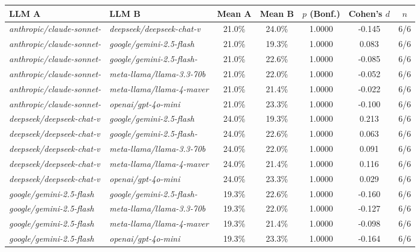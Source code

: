\begin{table}
\centering
{\scriptsize
\begin{tabular}{l|l|c|c|c|c|c}
\textbf{LLM A} & \textbf{LLM B} & \textbf{Mean A} & \textbf{Mean B} & \textbf{$p$ (Bonf.)} & \textbf{Cohen's $d$} & \textbf{$n$} \\
\hline\hline
\textit{anthropic/claude-sonnet-} & \textit{deepseek/deepseek-chat-v} & 21.0\% & 24.0\% & 1.0000 & -0.145 & 6/6 \\
\textit{anthropic/claude-sonnet-} & \textit{google/gemini-2.5-flash} & 21.0\% & 19.3\% & 1.0000 & 0.083 & 6/6 \\
\textit{anthropic/claude-sonnet-} & \textit{google/gemini-2.5-flash-} & 21.0\% & 22.6\% & 1.0000 & -0.085 & 6/6 \\
\textit{anthropic/claude-sonnet-} & \textit{meta-llama/llama-3.3-70b} & 21.0\% & 22.0\% & 1.0000 & -0.052 & 6/6 \\
\textit{anthropic/claude-sonnet-} & \textit{meta-llama/llama-4-maver} & 21.0\% & 21.4\% & 1.0000 & -0.022 & 6/6 \\
\textit{anthropic/claude-sonnet-} & \textit{openai/gpt-4o-mini} & 21.0\% & 23.3\% & 1.0000 & -0.100 & 6/6 \\
\textit{deepseek/deepseek-chat-v} & \textit{google/gemini-2.5-flash} & 24.0\% & 19.3\% & 1.0000 & 0.213 & 6/6 \\
\textit{deepseek/deepseek-chat-v} & \textit{google/gemini-2.5-flash-} & 24.0\% & 22.6\% & 1.0000 & 0.063 & 6/6 \\
\textit{deepseek/deepseek-chat-v} & \textit{meta-llama/llama-3.3-70b} & 24.0\% & 22.0\% & 1.0000 & 0.091 & 6/6 \\
\textit{deepseek/deepseek-chat-v} & \textit{meta-llama/llama-4-maver} & 24.0\% & 21.4\% & 1.0000 & 0.116 & 6/6 \\
\textit{deepseek/deepseek-chat-v} & \textit{openai/gpt-4o-mini} & 24.0\% & 23.3\% & 1.0000 & 0.029 & 6/6 \\
\textit{google/gemini-2.5-flash} & \textit{google/gemini-2.5-flash-} & 19.3\% & 22.6\% & 1.0000 & -0.160 & 6/6 \\
\textit{google/gemini-2.5-flash} & \textit{meta-llama/llama-3.3-70b} & 19.3\% & 22.0\% & 1.0000 & -0.127 & 6/6 \\
\textit{google/gemini-2.5-flash} & \textit{meta-llama/llama-4-maver} & 19.3\% & 21.4\% & 1.0000 & -0.098 & 6/6 \\
\textit{google/gemini-2.5-flash} & \textit{openai/gpt-4o-mini} & 19.3\% & 23.3\% & 1.0000 & -0.164 & 6/6 \\

\end{tabular}}
\end{table}
